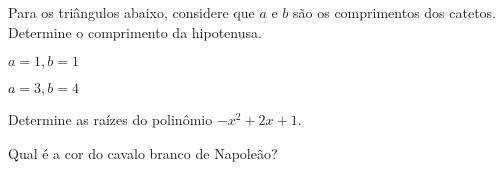 \documentclass[addpoints,11pt]{provaufabc}
\begin{document}
\begin{question}
\label{quest:triangulo}
    Para os triângulos abaixo, considere que $a$ e $b$ são os
    comprimentos dos catetos. Determine o comprimento da
    hipotenusa.

    \begin{subquestion}[1.5]
        \label{subquest:triangulo1}
        $a = 1, b = 1$
    \end{subquestion}
    \begin{subquestion}[2.5]
        \label{subquest:triangulo2}
        $a = 3, b = 4$
    \end{subquestion}
\end{question}

\begin{question}[3.75]
Determine as raízes do polinômio $-x^2 + 2x + 1$.
\end{question}

\begin{question}[2.25]
Qual é a cor do cavalo branco de Napoleão?
\end{question}
\end{document}
